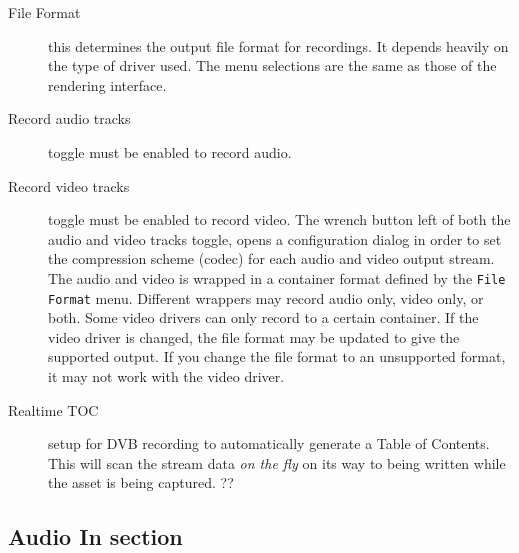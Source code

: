 \begin{description}
    \item[File Format] this determines the output file format for recordings. It depends heavily on the type of driver used. The menu selections are the same as those of the rendering interface.
    \item[Record audio tracks] toggle must be enabled to record audio.
    \item[Record video tracks] toggle must be enabled to record video. The wrench button left of both the audio and video tracks toggle, opens a configuration dialog in order to set the compression scheme (codec) for each audio and video output stream. The audio and video is wrapped in a container format defined by the \texttt{File Format} menu. Different wrappers may record audio only, video only, or both.  Some video drivers can only record to a certain container. If the video driver is changed, the file format may be updated to give the supported output. If you change the file format to an unsupported format, it may not work with the video driver.
    \item[Realtime TOC] setup for DVB recording to automatically generate a Table of Contents. This will scan the stream data \textit{on the fly} on its way to being written while the asset is being captured. ??
\end{description}

\subsection{Audio In section}%
\label{sub:audio_in_section}

